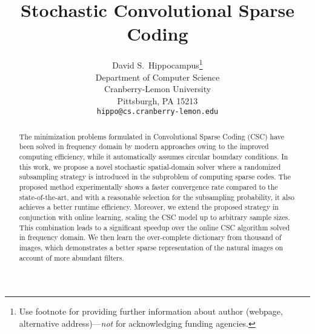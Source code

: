 \documentclass{article}
\title{Stochastic Convolutional Sparse Coding}
\author{
  David S.~Hippocampus\thanks{Use footnote for providing further
    information about author (webpage, alternative
    address)---\emph{not} for acknowledging funding agencies.} \\
  Department of Computer Science\\
  Cranberry-Lemon University\\
  Pittsburgh, PA 15213 \\
  \texttt{hippo@cs.cranberry-lemon.edu} \\
}
\begin{document}

\maketitle


\begin{abstract}
The minimization problems formulated in Convolutional Sparse Coding (CSC) have been solved in frequency domain by modern approaches owing to the improved computing efficiency, while it automatically assumes circular boundary conditions. In this work, we propose a novel stochastic spatial-domain solver where a randomized subsampling strategy is introduced in the subproblem of computing sparse codes. The proposed method experimentally shows a faster convergence rate compared to the state-of-the-art, and with a reasonable selection for the subsampling probability, it also achieves a better runtime efficiency. Moreover, we extend the proposed strategy in conjunction with online learning, scaling the CSC model up to arbitrary sample sizes. This combination leads to a significant speedup over the online CSC algorithm solved in frequency domain. We then learn the over-complete dictionary from thousand of images, which demonstrates a better sparse representation of the natural images on account of more abundant filters.
\end{abstract}











{\small


}
\end{document}
